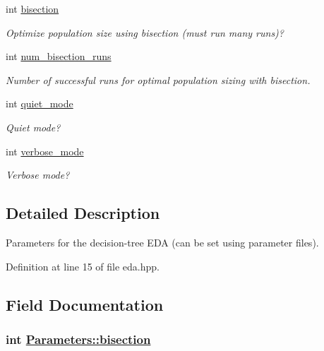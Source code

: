 \begin{CompactItemize}
int \hyperlink{struct_parameters_0b33fe6e096af04c8cee011807b06288}{bisection}
\begin{CompactList}\small\item\em Optimize population size using bisection (must run many runs)? \item\end{CompactList}\item 
int \hyperlink{struct_parameters_5fcf099ba77f2cf31f3de4e7d190d97d}{num\_\-bisection\_\-runs}
\begin{CompactList}\small\item\em Number of successful runs for optimal population sizing with bisection. \item\end{CompactList}\item 
int \hyperlink{struct_parameters_7c7a2312e852e436931e2ce6f6f082d2}{quiet\_\-mode}
\begin{CompactList}\small\item\em Quiet mode? \item\end{CompactList}\item 
int \hyperlink{struct_parameters_edbef1c42fc849f568bf3dc79398f8a7}{verbose\_\-mode}
\begin{CompactList}\small\item\em Verbose mode? \item\end{CompactList}\end{CompactItemize}


\subsection{Detailed Description}
Parameters for the decision-tree EDA (can be set using parameter files). 



Definition at line 15 of file eda.hpp.

\subsection{Field Documentation}
\hypertarget{struct_parameters_0b33fe6e096af04c8cee011807b06288}{
\subsubsection[bisection]{\setlength{\rightskip}{0pt plus 5cm}int \hyperlink{struct_parameters_0b33fe6e096af04c8cee011807b06288}{Parameters::bisection}}}
\label{struct_parameters_0b33fe6e096af04c8cee011807b06288}


